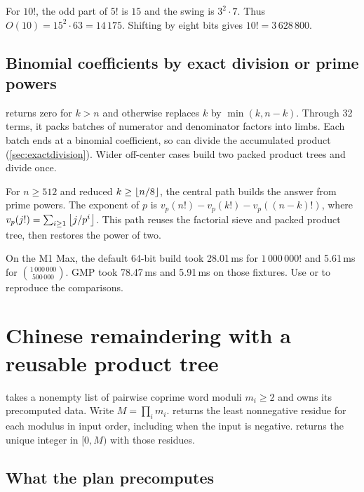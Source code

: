 \begin{example}
For $10!$, the odd part of $5!$ is $15$ and the swing is $3^2\cdot7$.
Thus $O(10)=15^2\cdot63=14\,175$. Shifting by eight bits gives
$10!=3\,628\,800$.
\end{example}

\subsection{Binomial coefficients by exact division or prime powers}

 returns zero for $k>n$ and otherwise replaces $k$
by $\min(k,n-k)$. Through 32 terms, it packs batches of numerator
and denominator factors into limbs. Each batch ends at a binomial
coefficient, so  can divide the accumulated product
(\cref{sec:exactdivision}). Wider off-center cases build two packed
product trees and divide once.

For $n\ge512$ and reduced $k\ge\left\lfloor n/8 \right\rfloor$, the central path builds
the answer from prime powers. The exponent of $p$ is
$v_p(n!)-v_p(k!)-v_p((n-k)!)$, where
$v_p(j!)=\sum_{i\ge1}\left\lfloor j/p^i \right\rfloor$. This path reuses the factorial
sieve and packed product tree, then restores the power of two.

\begin{perfnote}
On the M1 Max, the default 64-bit build took 28.01\,ms for
$1\,000\,000!$ and 5.61\,ms for $\binom{1\,000\,000}{500\,000}$.
GMP took 78.47\,ms and 5.91\,ms on those fixtures.
Use  or
 to reproduce the comparisons.
\end{perfnote}

\newpage
\section{Chinese remaindering with a reusable product tree}
\label{sec:crtplan}

 takes a nonempty list of pairwise coprime
word moduli $m_i\ge2$ and owns its precomputed data. Write
$M=\prod_i m_i$.  returns the least nonnegative
residue for each modulus in input order, including when the input is
negative.  returns the unique integer in
$[0,M)$ with those residues.

\subsection{What the plan precomputes}

